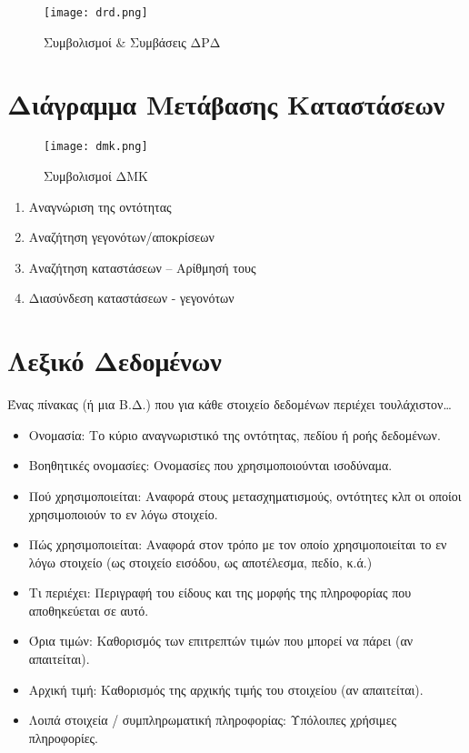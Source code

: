 \begin{figure}[H]
	\centering
	\texttt{[image: drd.png]}
	\caption{Συμβολισμοί \& Συμβάσεις ΔΡΔ}
\end{figure}


\section{Διάγραμμα Μετάβασης Καταστάσεων}

\begin{figure}[H]
	\centering
	\texttt{[image: dmk.png]}
	\caption{Συμβολισμοί ΔΜΚ}
\end{figure}

\begin{enumerate}
	\item	Αναγνώριση της οντότητας
	\item	Αναζήτηση γεγονότων/αποκρίσεων
	\item	Αναζήτηση καταστάσεων – Αρίθμησή τους
	\item	Διασύνδεση καταστάσεων - γεγονότων
\end{enumerate}

\section{Λεξικό Δεδομένων}

Ένας πίνακας (ή μια Β.Δ.) που για κάθε στοιχείο δεδομένων περιέχει τουλάχιστον…

\begin{itemize}
	\item	Ονομασία: Το κύριο αναγνωριστικό της οντότητας, πεδίου ή ροής δεδομένων.
	\item	Βοηθητικές ονομασίες: Ονομασίες που χρησιμοποιούνται ισοδύναμα.
	\item	Πού χρησιμοποιείται: Αναφορά στους μετασχηματισμούς, οντότητες κλπ 
		οι οποίοι χρησιμοποιούν το εν λόγω στοιχείο.
	\item	Πώς χρησιμοποιείται: Αναφορά στον τρόπο με τον οποίο χρησιμοποιείται το εν λόγω στοιχείο
		(ως στοιχείο εισόδου, ως αποτέλεσμα, πεδίο, κ.ά.)
	\item	Τι περιέχει: Περιγραφή του είδους και της μορφής της πληροφορίας που αποθηκεύεται σε αυτό.
	\item	Όρια τιμών: Καθορισμός των επιτρεπτών τιμών που μπορεί να πάρει (αν απαιτείται).
	\item	Αρχική τιμή: Καθορισμός της αρχικής τιμής του στοιχείου (αν απαιτείται).
	\item	Λοιπά στοιχεία / συμπληρωματική πληροφορίας: Υπόλοιπες χρήσιμες πληροφορίες.
\end{itemize}

